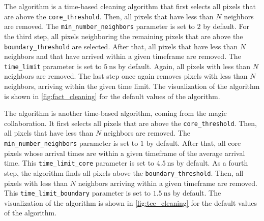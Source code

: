 The \fact{} algorithm is a time-based cleaning algorithm that first selects all pixels that are above
the \texttt{core\_threshold}. Then, all pixels that have less than \(N\) neighbors are removed. The
\texttt{min\_number\_neighbors} parameter is set to \(\num{2}\) by default. For the third step, all pixels neighboring
the remaining pixels that are above the \texttt{boundary\_threshold} are selected. After that, all
pixels that have less than \(N\) neighbors and that have arrived within a given timeframe are removed.
The \texttt{time\_limit} parameter is set to \(\SI{5}{\nano\second}\) by default. Again, all pixels
with less than \(N\) neighbors are removed. The last step once again removes pixels with less than
\(N\) neighbors, arriving within the given time limit. The visualization of the algorithm is shown in
\autoref{fig:fact_cleaning} for the default values of the algorithm.

The \tcc{} algorithm is another time-based algorithm, coming from the \gls{magic} collaboration.
It first selects all pixels that are above the \texttt{core\_threshold}. Then, all pixels that have
less than \(N\) neighbors are removed. The \texttt{min\_number\_neighbors} parameter is set to \(\num{1}\) by default.
After that, all core pixels whose arrival times are within a given timeframe of the average arrival time.
This \texttt{time\_limit\_core} parameter is set to \(\SI{4.5}{\nano\second}\) by default. As a fourth step,
the \tcc{} algorithm finds all pixels above the \texttt{boundary\_threshold}. Then, all pixels with
less than \(N\) neighbors arriving within a given timeframe are removed. This \texttt{time\_limit\_boundary}
parameter is set to \(\SI{1.5}{\nano\second}\) by default. The visualization of the algorithm is shown in
\autoref{fig:tcc_cleaning} for the default values of the algorithm.

